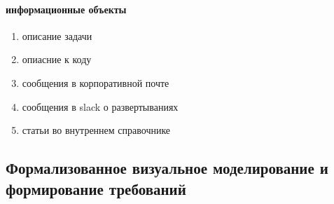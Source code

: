 \documentclass{article}
\begin{document}
\paragraph{информационные объекты}
\begin{enumerate}
    \item{описание задачи}
    \item{опиасние к коду}
    \item{сообщения в корпоративной почте}
    \item{сообщения в slack о развертываниях}
    \item{статьи во внутреннем справочнике}
\end{enumerate}


\pagebreak


\subsection{Формализованное визуальное моделирование и формирование требований}

\newcommand{\dia}[2]{
    \begin{figure}[!h]
        \texttt{[image: \#1]}
        \caption{#2 \cite{wiki}}
    \end{figure}
    \pagebreak
}
\end{document}
